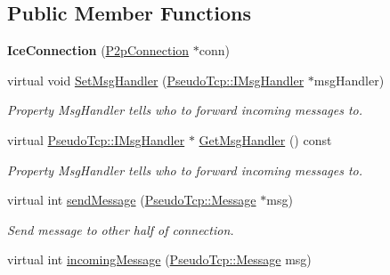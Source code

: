 \subsection*{Public Member Functions}
\begin{DoxyCompactItemize}
\item 
\hypertarget{classIceConnection_ae55802559fd5a75ad33486343a94a558}{
{\bfseries IceConnection} (\hyperlink{structP2pConnection}{P2pConnection} $\ast$conn)}
\label{classIceConnection_ae55802559fd5a75ad33486343a94a558}

\item 
\hypertarget{classIceConnection_ae2d71cdc1d53c4a7c8e55c24e31a2975}{
virtual void \hyperlink{classIceConnection_ae2d71cdc1d53c4a7c8e55c24e31a2975}{SetMsgHandler} (\hyperlink{classPseudoTcp_1_1IMsgHandler}{PseudoTcp::IMsgHandler} $\ast$msgHandler)}
\label{classIceConnection_ae2d71cdc1d53c4a7c8e55c24e31a2975}

\begin{DoxyCompactList}\small\item\em Property MsgHandler tells who to forward incoming messages to. \item\end{DoxyCompactList}\item 
\hypertarget{classIceConnection_a7da6f8856993f364ffae69058f0f0ce9}{
virtual \hyperlink{classPseudoTcp_1_1IMsgHandler}{PseudoTcp::IMsgHandler} $\ast$ \hyperlink{classIceConnection_a7da6f8856993f364ffae69058f0f0ce9}{GetMsgHandler} () const }
\label{classIceConnection_a7da6f8856993f364ffae69058f0f0ce9}

\begin{DoxyCompactList}\small\item\em Property MsgHandler tells who to forward incoming messages to. \item\end{DoxyCompactList}\item 
\hypertarget{classIceConnection_a195847a0829721e04e506bb64e5f904e}{
virtual int \hyperlink{classIceConnection_a195847a0829721e04e506bb64e5f904e}{sendMessage} (\hyperlink{classPseudoTcp_1_1Message}{PseudoTcp::Message} $\ast$msg)}
\label{classIceConnection_a195847a0829721e04e506bb64e5f904e}

\begin{DoxyCompactList}\small\item\em Send message to other half of connection. \item\end{DoxyCompactList}\item 
\hypertarget{classIceConnection_a475f6891e8aaeb44aa95f52c4961073a}{
virtual int \hyperlink{classIceConnection_a475f6891e8aaeb44aa95f52c4961073a}{incomingMessage} (\hyperlink{classPseudoTcp_1_1Message}{PseudoTcp::Message} msg)}
\label{classIceConnection_a475f6891e8aaeb44aa95f52c4961073a}


\end{DoxyCompactItemize}
